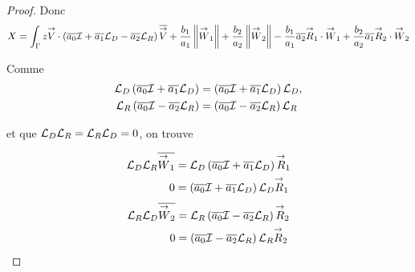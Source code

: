 \begin{proof}
    Donc 
    \begin{equation*}
      X = \int_\Gamma z \vV \cdot \left(\conj{a_0}\oI  + \conj{a_1} \LD - \conj{a_2}\LR\right)\conj{\vV} + \frac{b_1}{a_1} \norm{\vW_1} +\frac{b_2}{a_2} \norm{\vW_2} - \frac{b_1}{a_1}\conj{a_2}\vR_1\cdot\vW_1 + \frac{b_2}{a_2}\conj{a_1}\vR_2\cdot\vW_2
    \end{equation*}

    Comme
    \begin{align*}
      \LD\left(\conj{a_0}\oI  + \conj{a_1} \LD \right)&=\left(\conj{a_0}\oI  + \conj{a_1} \LD \right)\LD,
      \\
      \LR\left(\conj{a_0}\oI  - \conj{a_2} \LR \right)&=\left(\conj{a_0}\oI  - \conj{a_2} \LR \right)\LR
    \end{align*}

    et que \(\LD\LR=\LR\LD=0\), on trouve

    \begin{equation*}
      \begin{aligned}
        \LD\LR\conj{\vW_1} &= \LD\left(\conj{a_0}\oI  + \conj{a_1} \LD \right)\vR_1
        \\
        0 & =\left(\conj{a_0}\oI  + \conj{a_1} \LD \right)\LD\vR_1
      \end{aligned}
    \end{equation*}
    \begin{equation*}
      \begin{aligned}
        \LR\LD\conj{\vW_2} &= \LR\left(\conj{a_0}\oI  - \conj{a_2} \LR \right)\vR_2
        \\
        0 & =\left(\conj{a_0}\oI  - \conj{a_2} \LR \right)\LR\vR_2
      \end{aligned}
    \end{equation*}


      

\end{proof}
